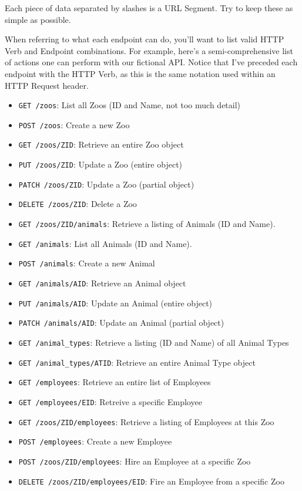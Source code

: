 \documentclass{book}
\begin{document}
Each piece of data separated by slashes is a URL Segment. Try to keep these as simple as possible.

When referring to what each endpoint can do, you'll want to list valid HTTP Verb and Endpoint combinations. For example, here's a semi-comprehensive list of actions one can perform with our fictional API. Notice that I've preceded each endpoint with the HTTP Verb, as this is the same notation used within an HTTP Request header.

\begin{itemize}
\item \texttt{GET /zoos}: List all Zoos (ID and Name, not too much detail)
\item \texttt{POST /zoos}: Create a new Zoo
\item \texttt{GET /zoos/ZID}: Retrieve an entire Zoo object
\item \texttt{PUT /zoos/ZID}: Update a Zoo (entire object)
\item \texttt{PATCH /zoos/ZID}: Update a Zoo (partial object)
\item \texttt{DELETE /zoos/ZID}: Delete a Zoo
\item \texttt{GET /zoos/ZID/animals}: Retrieve a listing of Animals (ID and Name).
\item \texttt{GET /animals}: List all Animals (ID and Name).
\item \texttt{POST /animals}: Create a new Animal
\item \texttt{GET /animals/AID}: Retrieve an Animal object
\item \texttt{PUT /animals/AID}: Update an Animal (entire object)
\item \texttt{PATCH /animals/AID}: Update an Animal (partial object)
\item \texttt{GET /animal\_types}: Retrieve a listing (ID and Name) of all Animal Types
\item \texttt{GET /animal\_types/ATID}: Retrieve an entire Animal Type object
\item \texttt{GET /employees}: Retrieve an entire list of Employees
\item \texttt{GET /employees/EID}: Retreive a specific Employee
\item \texttt{GET /zoos/ZID/employees}: Retrieve a listing of Employees at this Zoo
\item \texttt{POST /employees}: Create a new Employee
\item \texttt{POST /zoos/ZID/employees}: Hire an Employee at a specific Zoo
\item \texttt{DELETE /zoos/ZID/employees/EID}: Fire an Employee from a specific Zoo
\end{itemize}
\end{document}
